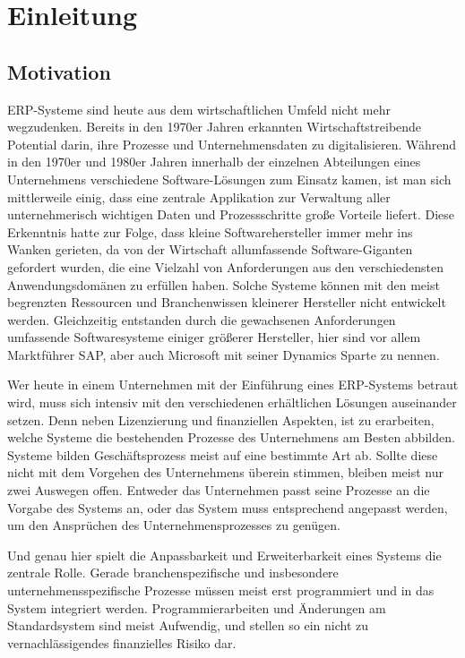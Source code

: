 \chapter{Einleitung}
\label{cha:Einleitung}

\section{Motivation}
\label{sec:Motivation}

ERP-Systeme sind heute aus dem wirtschaftlichen Umfeld nicht mehr wegzudenken. Bereits in den 1970er Jahren erkannten Wirtschaftstreibende Potential darin, ihre Prozesse und Unternehmensdaten zu digitalisieren. Während in den 1970er und 1980er Jahren innerhalb der einzelnen Abteilungen eines Unternehmens verschiedene Software-Lösungen zum Einsatz kamen, ist man sich mittlerweile einig, dass eine zentrale Applikation zur Verwaltung aller unternehmerisch wichtigen Daten und Prozessschritte große Vorteile liefert. Diese Erkenntnis hatte zur Folge, dass kleine Softwarehersteller immer mehr ins Wanken gerieten, da von der Wirtschaft allumfassende Software-Giganten gefordert wurden, die eine Vielzahl von Anforderungen aus den verschiedensten Anwendungsdomänen zu erfüllen haben. Solche Systeme können mit den meist begrenzten Ressourcen und Branchenwissen kleinerer Hersteller nicht entwickelt werden. Gleichzeitig entstanden durch die gewachsenen Anforderungen umfassende Softwaresysteme einiger größerer Hersteller, hier sind vor allem Marktführer SAP, aber auch Microsoft mit seiner Dynamics Sparte zu nennen.

Wer heute in einem Unternehmen mit der Einführung eines ERP-Systems betraut wird, muss sich intensiv mit den verschiedenen erhältlichen Lösungen auseinander setzen. Denn neben Lizenzierung und finanziellen Aspekten, ist zu erarbeiten, welche Systeme die bestehenden Prozesse des Unternehmens am Besten abbilden. Systeme bilden Geschäftsprozess meist auf eine bestimmte Art ab. Sollte diese nicht mit dem Vorgehen des Unternehmens überein stimmen, bleiben meist nur zwei Auswegen offen. Entweder das Unternehmen passt seine Prozesse an die Vorgabe des Systems an, oder das System muss entsprechend angepasst werden, um den Ansprüchen des Unternehmensprozesses zu genügen.

Und genau hier spielt die Anpassbarkeit und Erweiterbarkeit eines Systems die zentrale Rolle. Gerade branchenspezifische und insbesondere unternehmensspezifische Prozesse müssen meist erst programmiert und in das System integriert werden. Programmierarbeiten und Änderungen am Standardsystem sind meist Aufwendig, und stellen so ein nicht zu vernachlässigendes finanzielles Risiko dar.

